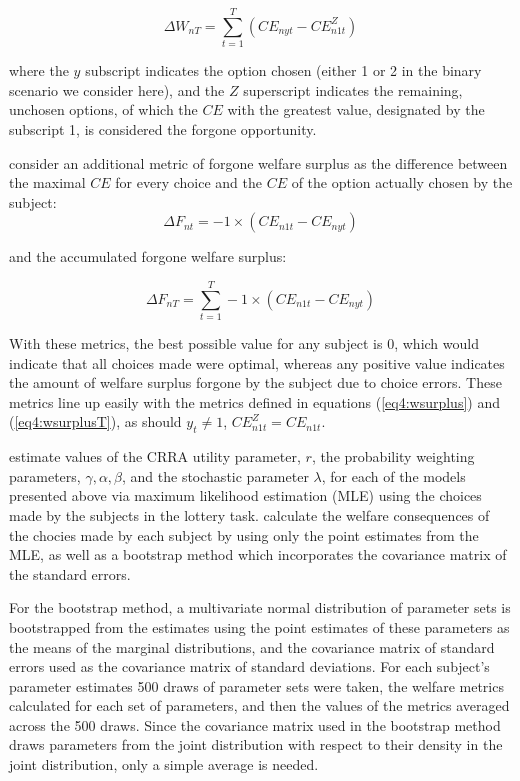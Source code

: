\documentclass[11pt,a4paper]{report}
\newcommand\CE{\ensuremath{\mathit{CE}}}    %
\begin{document}
\begin{equation}
	\label{eq4:wsurplusT}
	\Delta W_{nT} = \sum_{t=1}^T \left( {\CE}_{nyt} - {\CE}_{n1t}^Z \right)
\end{equation}

\noindent where the $y$ subscript indicates the option chosen (either 1 or 2 in the binary scenario we consider here), and the $Z$ superscript indicates the remaining, unchosen options, of which the {\CE} with the greatest value, designated by the subscript 1, is considered the forgone opportunity.

\textcite[106]{Harrison2016} consider an additional metric of forgone welfare surplus as the difference between the maximal {\CE} for every choice and the {\CE} of the option actually chosen by the subject:
\begin{equation}
	\label{eq4:wforgone}
	\Delta F_{nt} = -1 \times \left( {\CE}_{n1t} - {\CE}_{nyt} \right)
\end{equation}

\noindent and the accumulated forgone welfare surplus:

\begin{equation}
	\label{eq4:wforgoneT}
	\Delta F_{nT} = \sum_{t=1}^T  -1 \times \left( {\CE}_{n1t} - {\CE}_{nyt} \right)
\end{equation}

\noindent With these metrics, the best possible value for any subject is 0, which would indicate that all choices made were optimal, whereas any positive value indicates the amount of welfare surplus forgone by the subject due to choice errors.
These metrics line up easily with the metrics defined in equations (\ref{eq4:wsurplus}) and (\ref{eq4:wsurplusT}), as should $y_t \neq 1$, ${\CE}_{n1t}^Z = {\CE}_{n1t}$.

\textcite{Harrison2016} estimate values of the CRRA utility parameter, $r$, the probability weighting parameters, $\gamma, \alpha, \beta$, and the stochastic parameter $\lambda$, for each of the models presented above via maximum likelihood estimation (MLE) using the choices made by the subjects in the lottery task.
\textcite[107,110]{Harrison2016} calculate the welfare consequences of the chocies made by each subject by using only the point estimates from the MLE, as well as a bootstrap method which incorporates the covariance matrix of the standard errors.

For the bootstrap method, a multivariate normal distribution of parameter sets is bootstrapped from the estimates using the point estimates of these parameters as the means of the marginal distributions, and the covariance matrix of standard errors used as the covariance matrix of standard deviations.
For each subject's parameter estimates 500 draws of parameter sets were taken, the welfare metrics calculated for each set of parameters, and then the values of the metrics averaged across the 500 draws.
Since the covariance matrix used in the bootstrap method draws parameters from the joint distribution with respect to their density in the joint distribution, only a simple average is needed.
\end{document}
